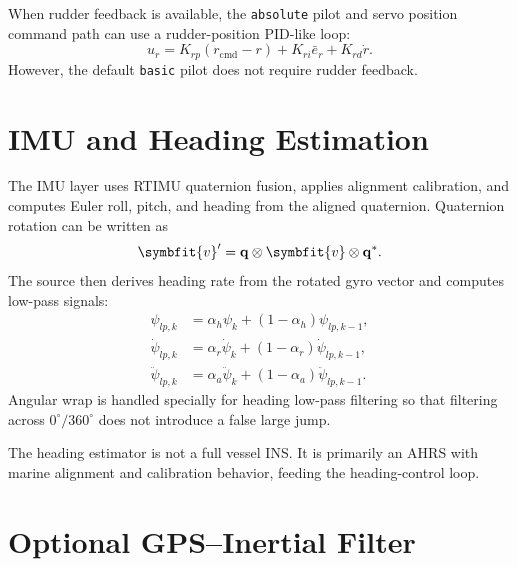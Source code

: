 \documentclass[11pt,twocolumn]{article}
\newcommand{\vct}[1]{\symbfit{#1}}   %
\newcommand{\quat}[1]{\mathbf{#1}}
\newcommand{\qconj}[1]{#1^{*}}
\newcommand{\qmul}{\otimes}
\newcommand{\heading}{\psi}
\newcommand{\cmd}{\mathrm{cmd}}
\begin{document}
When rudder feedback is available, the \texttt{absolute} pilot and servo position command
path can use a rudder-position PID-like loop:
\begin{equation}
  u_r = K_{rp}(r_{\cmd}-r) + K_{ri}\bar e_r + K_{rd}\dot r.
\end{equation}
However, the default \texttt{basic} pilot does not require rudder feedback.

\section{IMU and Heading Estimation}

The IMU layer uses RTIMU quaternion fusion, applies alignment calibration, and computes
Euler roll, pitch, and heading from the aligned quaternion.  Quaternion rotation can be
written as
\begin{equation}
  \vct{v}' = \quat{q}\qmul \vct{v}\qmul \qconj{\quat{q}}.
\end{equation}
The source then derives heading rate from the rotated gyro vector and computes low-pass
signals:
\begin{align}
  \heading_{lp,k} &= \alpha_h \heading_k + (1-\alpha_h)\heading_{lp,k-1}, \\
  \dot{\heading}_{lp,k} &= \alpha_r \dot{\heading}_k
     + (1-\alpha_r)\dot{\heading}_{lp,k-1}, \\
  \ddot{\heading}_{lp,k} &= \alpha_a \ddot{\heading}_k
     + (1-\alpha_a)\ddot{\heading}_{lp,k-1}.
\end{align}
Angular wrap is handled specially for heading low-pass filtering so that filtering across
\(0^{\circ}/360^{\circ}\) does not introduce a false large jump.

The heading estimator is not a full vessel INS.  It is primarily an AHRS with marine
alignment and calibration behavior, feeding the heading-control loop.

\section{Optional GPS--Inertial Filter}
\end{document}
